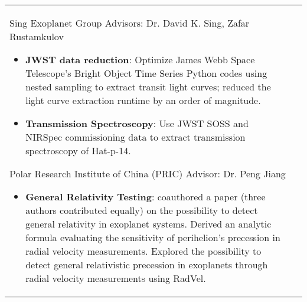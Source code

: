 \begin{paracol}{1}
\begin{supertabular}{L{4cm}@{\hskip 0.3in}L{13cm}}
                              {Sing Exoplanet Group} %
                              {Advisors: Dr. David K. Sing, Zafar Rustamkulov} %
                              {\begin{itemize}
                                  \vspace{-0.4cm}
                                \item \textbf{JWST data reduction}: Optimize James Webb Space Telescope's Bright Object Time Series Python codes using nested sampling to extract transit light curves; reduced the light curve extraction runtime by an order of magnitude.
                                \item \textbf{Transmission Spectroscopy}: Use JWST SOSS and NIRSpec commissioning data to extract transmission spectroscopy of Hat-p-14.
                              \end{itemize}} %

                                           {Polar Research Institute of China (PRIC)} %
                                           {Advisor: Dr. Peng Jiang} %
                                           {\begin{itemize}
                                               \vspace{-0.4cm}
                                             \item \textbf{General Relativity Testing}: coauthored a paper (three authors contributed equally) on the possibility to detect general relativity in exoplanet systems. Derived an analytic formula evaluating the sensitivity of perihelion’s precession in radial velocity measurements. Explored the possibility to detect general relativistic precession in exoplanets through radial velocity measurements using RadVel.
                                           \end{itemize}} %



\end{supertabular}
\end{paracol}
